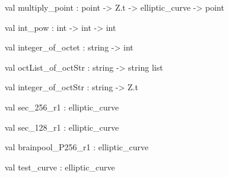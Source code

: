 \documentclass[11pt]{article}
\begin{document}
\begin{ocamldocsigend}
\label{val:Ecc.Ecc.multiply-underscorepoint}\begin{ocamldoccode}
val multiply_point : point -> Z.t -> elliptic_curve -> point
\end{ocamldoccode}


\label{val:Ecc.Ecc.int-underscorepow}\begin{ocamldoccode}
val int_pow : int -> int -> int
\end{ocamldoccode}


\label{val:Ecc.Ecc.integer-underscoreof-underscoreoctet}\begin{ocamldoccode}
val integer_of_octet : string -> int
\end{ocamldoccode}


\label{val:Ecc.Ecc.octList-underscoreof-underscoreoctStr}\begin{ocamldoccode}
val octList_of_octStr : string -> string list
\end{ocamldoccode}


\label{val:Ecc.Ecc.integer-underscoreof-underscoreoctStr}\begin{ocamldoccode}
val integer_of_octStr : string -> Z.t
\end{ocamldoccode}


\label{val:Ecc.Ecc.sec-underscore256-underscorer1}\begin{ocamldoccode}
val sec_256_r1 : elliptic_curve
\end{ocamldoccode}


\label{val:Ecc.Ecc.sec-underscore128-underscorer1}\begin{ocamldoccode}
val sec_128_r1 : elliptic_curve
\end{ocamldoccode}


\label{val:Ecc.Ecc.brainpool-underscoreP256-underscorer1}\begin{ocamldoccode}
val brainpool_P256_r1 : elliptic_curve
\end{ocamldoccode}


\label{val:Ecc.Ecc.test-underscorecurve}\begin{ocamldoccode}
val test_curve : elliptic_curve
\end{ocamldoccode}



\end{ocamldocsigend}
\end{document}

